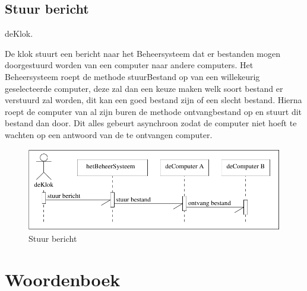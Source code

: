 \documentclass[a4paper,oneside]{report}
\begin{document}
\newpage
\subsection{Stuur bericht}
deKlok.

De klok stuurt een bericht naar het Beheersysteem dat er bestanden mogen doorgestuurd worden van een computer naar andere computers. Het Beheersysteem roept de methode stuurBestand op van een willekeurig geselecteerde computer, deze zal dan een keuze maken welk soort bestand er verstuurd zal worden, dit kan een goed bestand zijn of een slecht bestand. Hierna roept de computer van al zijn buren de methode ontvangbestand op en stuurt dit bestand dan door. Dit alles gebeurt asynchroon zodat de computer niet hoeft te wachten op een antwoord van de te ontvangen computer.

\begin{figure}[h!]
\begin{center}
\includegraphics[scale=0.9]{seq_stuur_bericht}
\caption{Stuur bericht}
\end{center}
\end{figure}

\newpage
\section{Woordenboek}
\end{document}
